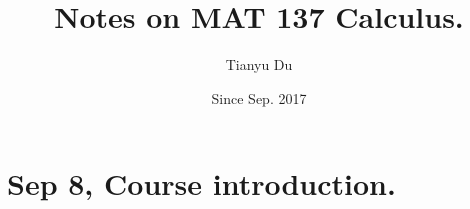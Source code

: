 \documentclass{article}
\author{Tianyu Du}
\date{Since Sep. 2017}
\title{Notes on MAT 137 Calculus.}
\begin{document}
	\maketitle
	\tableofcontents
	\section{Sep 8, Course introduction.}
	\paragraph{}
\end{document}
